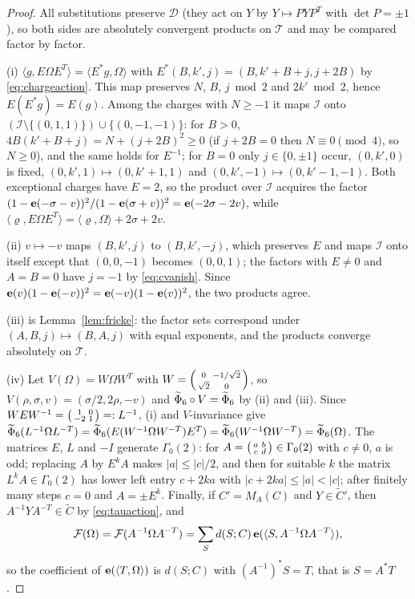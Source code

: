 \begin{proof}
All substitutions preserve $\mathcal D$ (they act on $Y$ by $Y\mapsto PYP^T$ with $\det P=\pm1$), so both sides are absolutely convergent products on $\mathcal T$ and may be compared factor by factor.

(i) $\langle g,E\Omega E^T\rangle=\langle E^\ast g,\Omega\rangle$ with $E^\ast(B,k',j)=(B,k'+B+j,j+2B)$ by \eqref{eq:chargeaction}. This map preserves $N$, $B$, $j\bmod2$ and $2k'\bmod2$, hence $E(E^\ast g)=E(g)$. Among the charges with $N\ge-1$ it maps $\mathcal I$ onto $(\mathcal I\setminus\{(0,1,1)\})\cup\{(0,-1,-1)\}$: for $B>0$, $4B(k'+B+j)=N+(j+2B)^2\ge0$ (if $j+2B=0$ then $N\equiv0\pmod 4$, so $N\ge0$), and the same holds for $E^{-1}$; for $B=0$ only $j\in\{0,\pm1\}$ occur, $(0,k',0)$ is fixed, $(0,k',1)\mapsto(0,k'+1,1)$ and $(0,k',-1)\mapsto(0,k'-1,-1)$. Both exceptional charges have $E=2$, so the product over $\mathcal I$ acquires the factor $(1-\mathbf e(-\sigma-v))^2/(1-\mathbf e(\sigma+v))^2=\mathbf e(-2\sigma-2v)$, while $\langle\varrho,E\Omega E^T\rangle=\langle\varrho,\Omega\rangle+2\sigma+2v$.

(ii) $v\mapsto-v$ maps $(B,k',j)$ to $(B,k',-j)$, which preserves $E$ and maps $\mathcal I$ onto itself except that $(0,0,-1)$ becomes $(0,0,1)$; the factors with $E\ne0$ and $A=B=0$ have $j=-1$ by \eqref{eq:cvanish}. Since $\mathbf e(v)(1-\mathbf e(-v))^2=\mathbf e(-v)(1-\mathbf e(v))^2$, the two products agree.

(iii) is Lemma~\ref{lem:fricke}: the factor sets correspond under $(A,B,j)\mapsto(B,A,j)$ with equal exponents, and the products converge absolutely on $\mathcal T$.

(iv) Let $V(\Omega)=W\Omega W^T$ with $W=\begin{psmallmatrix}0&-1/\sqrt2\\\sqrt2&0\end{psmallmatrix}$, so $V(\rho,\sigma,v)=(\sigma/2,2\rho,-v)$ and $\widetilde\Phi_6\circ V=\widetilde\Phi_6$ by (ii) and (iii). Since $WEW^{-1}=\begin{psmallmatrix}1&0\\-2&1\end{psmallmatrix}=:L^{-1}$, (i) and $V$-invariance give $\widetilde\Phi_6(L^{-1}\Omega L^{-T})=\widetilde\Phi_6(E(W^{-1}\Omega W^{-T})E^T)=\widetilde\Phi_6(W^{-1}\Omega W^{-T})=\widetilde\Phi_6(\Omega)$. The matrices $E$, $L$ and $-I$ generate $\Gamma_0(2)$: for $A=\begin{psmallmatrix}a&b\\c&d\end{psmallmatrix}\in\Gamma_0(2)$ with $c\ne0$, $a$ is odd; replacing $A$ by $E^kA$ makes $|a|\le|c|/2$, and then for suitable $k$ the matrix $L^kA\in\Gamma_0(2)$ has lower left entry $c+2ka$ with $|c+2ka|\le|a|<|c|$; after finitely many steps $c=0$ and $A=\pm E^k$. Finally, if $C'=M_A(C)$ and $Y\in\tilde C'$, then $A^{-1}YA^{-T}\in\tilde C$ by \eqref{eq:tauaction}, and
\[
\mathcal F(\Omega)=\mathcal F(A^{-1}\Omega A^{-T})=\sum_{S}d(S;C)\,\mathbf e(\langle S,A^{-1}\Omega A^{-T}\rangle),
\]
so the coefficient of $\mathbf e(\langle T,\Omega\rangle)$ is $d(S;C)$ with $(A^{-1})^\ast S=T$, that is $S=A^\ast T$.
\end{proof}

